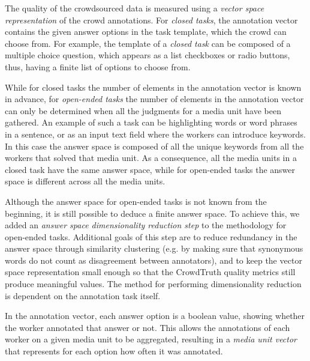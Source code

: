 The quality of the crowdsourced data is measured using a \textit{vector space representation} of the crowd annotations. For \emph{closed tasks}, the annotation vector contains the given answer options in the task template, which the crowd can choose from. For example, the template of a \emph{closed task} can be composed of a multiple choice question, which appears as a list checkboxes or radio buttons, thus, having a finite list of options to choose from.

While for closed tasks the number of elements in the annotation vector is known in advance, for \emph{open-ended tasks} the number of elements in the annotation vector can only be determined when all the judgments for a media unit have been gathered. An example of such a task can be highlighting words or word phrases in a sentence, or as an input text field where the workers can introduce keywords. In this case the answer space is composed of all the unique keywords from all the workers that solved that media unit. As a consequence, all the media units in a closed task have the same answer space, while for open-ended tasks the answer space is different across all the media units.

Although the answer space for open-ended tasks is not known from the beginning, it is still possible to deduce a finite answer space. To achieve this, we added an \textit{answer space dimensionality reduction step} to the methodology for open-ended tasks. Additional goals of this step are to reduce redundancy in the answer space through similarity clustering (e.g. by making sure that synonymous words do not count as disagreement between annotators), and to keep the vector space representation small enough so that the CrowdTruth quality metrics still produce meaningful values. The method for performing dimensionality reduction is dependent on the annotation task itself. %

In the annotation vector, each answer option is a boolean value, showing whether the worker annotated that answer or not. This allows the annotations of each worker on a given media unit to be aggregated, resulting in a \textit{media unit vector} that represents for each option how often it was annotated.

